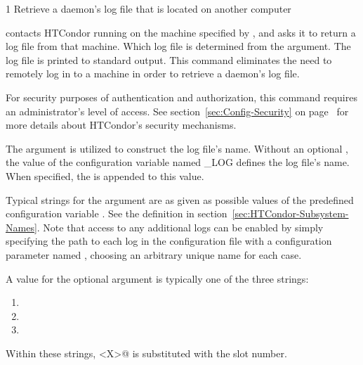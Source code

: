 \begin{ManPage}{\label{man-condor-fetchlog}}{1}
{Retrieve a daemon's log file that is located on another computer}

\Synopsis 
{}
\ToolArgsBase



\Description 

 contacts HTCondor running on the machine specified by
, and asks it to return a log file from that
machine.  Which log file is determined from
the  argument.
The log file is printed to standard output.
This command eliminates the need to remotely log in to a
machine in order to retrieve a daemon's log file.

For security purposes of authentication and authorization, 
this command requires an administrator's level of access.
See section~\ref{sec:Config-Security} 
on page~\pageref{sec:Config-Security} for more details about HTCondor's
security mechanisms.

The  argument is utilized to construct
the log file's name.
Without an optional ,
the value of the configuration variable named \_LOG 
defines the log file's name.
When specified, the  is appended to this value.

Typical strings for the argument  are as given as
possible values of the predefined configuration
variable .
See the definition in
section~\ref{sec:HTCondor-Subsystem-Names}.  Note that access to any
additional logs can be enabled by simply specifying the path to
each log in the configuration file with a configuration parameter named
, choosing an arbitrary unique name for each case.

A value for the optional  argument is typically one of
the three strings:
\begin{enumerate}
\item{}
\item{}
\item{}
\end{enumerate}
Within these strings, \verb@<X>@ is substituted with the slot number.
 

\end{ManPage}
